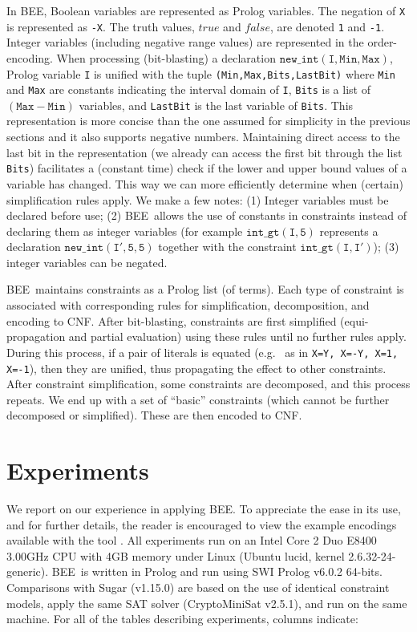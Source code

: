\documentclass{tlp}
\newcommand{\true}{\texttt{true}}
\newcommand{\false}{\mathit{false}}
\renewcommand{\true}{\mathit{true}}
\newcommand{\bee}{\textsf{BEE}}
\begin{document}
In \bee, Boolean variables are represented as Prolog variables. The
negation of \texttt{X} is represented as \texttt{-X}. The truth
values, $\true$ and $\false$, are denoted \texttt{1} and \texttt{-1}.
Integer variables (including negative range values) are represented in
the order-encoding. When processing (bit-blasting) a declaration
$\mathtt{new\_int(I,Min,Max)}$, Prolog variable \texttt{I} is unified
with the tuple \texttt{(Min,Max,Bits,LastBit)} where \texttt{Min} and
\texttt{Max} are constants indicating the interval domain of
\texttt{I}, \texttt{Bits} is a list of $\mathtt{(Max-Min)}$ variables,
and \texttt{LastBit} is the last variable of \texttt{Bits}. This
representation is more concise than the one assumed for simplicity in
the previous sections and it also supports negative
numbers. Maintaining direct access to the last bit in the
representation (we already can access the first bit through the list
\texttt{Bits}) facilitates a (constant time) check if the lower and
upper bound values of a variable has changed. This way we can more
efficiently determine when (certain) simplification rules apply.
We make a few notes: (1) Integer variables must be declared before
use; (2) \bee\ allows the use of constants in constraints instead of
declaring them as integer variables (for example
$\mathtt{int\_gt(I,5)}$ represents a declaration
$\mathtt{new\_int(I',5,5)}$ together with the constraint
$\mathtt{int\_gt(I,I')}$); (3) integer variables can be negated.

\bee\ maintains constraints as a Prolog list
(of terms).  Each type of constraint is associated with corresponding
rules for simplification, decomposition, and encoding to CNF.
After bit-blasting, constraints are first simplified (equi-propagation
and partial evaluation) using these rules until no further rules
apply. During this process, if a pair of literals is equated (e.g.~ as
in \texttt{X=Y, X=-Y, X=1, X=-1}), then they are unified, thus
propagating the effect to other constraints. 
After constraint simplification, some constraints are decomposed, and
this process repeats.
We end up with a set of ``basic'' constraints (which cannot be further
decomposed or simplified).  These are then encoded to CNF.



\section{Experiments}\label{results}


We report on our experience in applying \bee. To appreciate the ease
in its use, and for further details, the reader is encouraged to view
the example encodings available with the tool \cite{bee2012}.
All experiments run on an Intel Core 2 Duo E8400 3.00GHz CPU with 4GB
memory under Linux (Ubuntu lucid, kernel 2.6.32-24-generic).
\bee\ is written in Prolog and run using SWI Prolog v6.0.2 64-bits.
Comparisons with Sugar (v1.15.0) are based on the use of identical
constraint models, apply the same SAT solver (CryptoMiniSat v2.5.1),
and run on the same machine.
For all of the tables describing
experiments, columns indicate:
\end{document}
